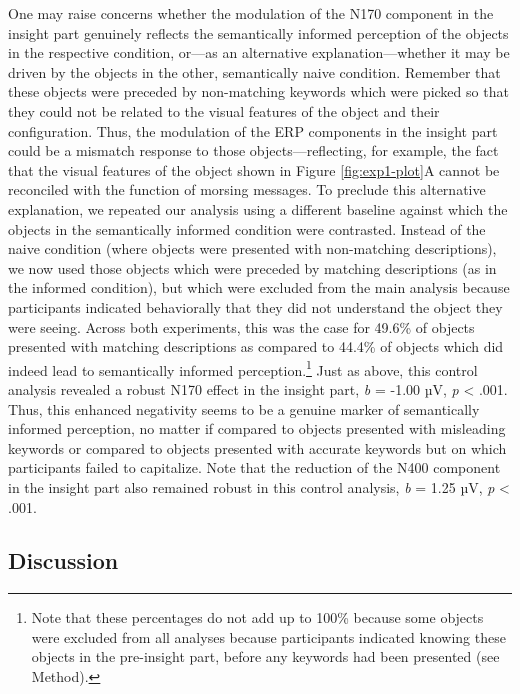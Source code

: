 \documentclass[
  english,
  doc,12pt,twoside,floatsintext]{apa7}
\begin{document}
One may raise concerns whether the modulation of the N170 component in the insight part genuinely reflects the semantically informed perception of the objects in the respective condition, or---as an alternative explanation---whether it may be driven by the objects in the other, semantically naive condition. Remember that these objects were preceded by non-matching keywords which were picked so that they could not be related to the visual features of the object and their configuration. Thus, the modulation of the ERP components in the insight part could be a mismatch response to those objects---reflecting, for example, the fact that the visual features of the object shown in Figure \ref{fig:exp1-plot}A cannot be reconciled with the function of morsing messages. To preclude this alternative explanation, we repeated our analysis using a different baseline against which the objects in the semantically informed condition were contrasted. Instead of the naive condition (where objects were presented with non-matching descriptions), we now used those objects which were preceded by matching descriptions (as in the informed condition), but which were excluded from the main analysis because participants indicated behaviorally that they did not understand the object they were seeing. Across both experiments, this was the case for 49.6\% of objects presented with matching descriptions as compared to 44.4\% of objects which did indeed lead to semantically informed perception.\footnote{Note that these percentages do not add up to 100\% because some objects were excluded from all analyses because participants indicated knowing these objects in the pre-insight part, before any keywords had been presented (see Method).} Just as above, this control analysis revealed a robust N170 effect in the insight part, \emph{b} = -1.00 µV, \emph{p} \textless{} .001. Thus, this enhanced negativity seems to be a genuine marker of semantically informed perception, no matter if compared to objects presented with misleading keywords or compared to objects presented with accurate keywords but on which participants failed to capitalize. Note that the reduction of the N400 component in the insight part also remained robust in this control analysis, \emph{b} = 1.25 µV, \emph{p} \textless{} .001.

\hypertarget{discussion-1}{%
\subsection{Discussion}\label{discussion-1}}
\end{document}

